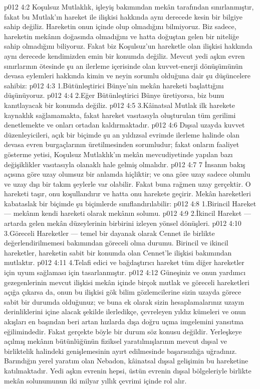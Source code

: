 \vs p012 4:2 Koşulsuz Mutlaklık, işleyiş bakımından mekân tarafından sınırlanmıştır, fakat bu Mutlak’ın hareket ile ilişkisi hakkında aynı derecede kesin bir bilgiye sahip değiliz. Hareketin onun içinde olup olmadığını bilmiyoruz. Biz sadece, hareketin mekânın doğasında olmadığını ve hatta  doğuştan gelen bir niteliğe sahip olmadığını biliyoruz. Fakat biz Koşulsuz’un hareketle olan ilişkisi hakkında aynı derecede kendimizden emin bir konumda değiliz. Mevcut yedi aşkın evren sınırlarının ötesinde şu an ilerleme içerisinde olan kuvvet\hyp{}enerji dönüşümünün devasa eylemleri hakkında kimin ve neyin sorumlu olduğuna dair şu düşüncelere sahibiz:
\vs p012 4:3 1.\bibnobreakspace Bütünleştirici Bünye’nin mekân  hareketi başlattığını düşünüyoruz.
\vs p012 4:4 2.\bibnobreakspace Eğer Bütünleştirici Bünye  üretiyorsa, biz bunu kanıtlayacak bir konumda değiliz.
\vs p012 4:5 3.\bibnobreakspace Kâinatsal Mutlak ilk harekete kaynaklık sağlamamakta, fakat hareket vasıtasıyla oluşturulan tüm gerilimi denetlemekte ve onları ortadan kaldırmaktadır.
\vs p012 4:6 Dışsal uzayda kuvvet düzenleyicileri, açık bir biçimde şu an yıldızsal evrimde ilerleme halinde olan devasa evren burgaçlarının üretilmesinden sorumludur; fakat onların faaliyet gösterme yetisi, Koşulsuz Mutlaklık’ın mekân mevcudiyetinde yapılan bazı değişiklikler vasıtasıyla olanaklı hale gelmiş olmalıdır.
\vs p012 4:7 7 İnsanın bakış açısına göre uzay olumsuz bir anlamda hiçliktir; ve ona göre uzay sadece olumlu ve uzay dışı bir takım şeylerle var olabilir. Fakat buna rağmen uzay gerçektir. O hareketi taşır, onu koşullandırır ve hatta onu harekete geçirir. Mekân hareketleri kabataslak bir biçimde şu biçimlerde sınıflandırılabilir:
\vs p012 4:8 1.\bibnobreakspace Birincil Hareket --- mekânın kendi hareketi olarak mekânın solumu.
\vs p012 4:9 2.\bibnobreakspace İkincil Hareket --- artarda gelen mekân düzeylerinin birbirini izleyen yönsel dönüşleri.
\vs p012 4:10 3.\bibnobreakspace Göreceli Hareketler --- temel bir dayanak olarak Cennet ile birlikte değerlendirilmemesi bakımından göreceli olma durumu. Birincil ve ikincil hareketler, hareketin sabit bir konumda olan Cennet’le ilişkisi bakımından mutlaktır.
\vs p012 4:11 4.\bibnobreakspace Telafi edici ve bağdaştırıcı hareket tüm diğer hareketler için uyum sağlaması için tasarlanmıştır.
\vs p012 4:12 Güneşiniz ve onun yardımcı gezegenlerinin mevcut ilişkisi mekân içinde birçok mutlak ve göreceli hareketleri açığa çıkarsa da, onun bu ilişkisi gök bilim gözlemcilerine sizin uzayda görece sabit bir durumda olduğunuz; ve buna ek olarak sizin hesaplamalarınız uzayın derinliklerini içine alacak şekilde ilerledikçe, çevreleyen yıldız kümeleri ve onun akışları en başından beri artan hızlarda dışa doğru uçma imgelemini yansıtma eğilimindedir. Fakat gerçekte böyle bir durum söz konusu değildir. Yerleşkeye açılmış mekânın bütünlüğünün fiziksel yaratılmışlarının mevcut dışsal ve birliktelik halindeki genişlemesinin ayırt edilmesinde başarısızlığa uğradınız. Barındığın yerel yaratım olan Nebadon, kâinatsal dışsal gelişimin bu hareketine katılmaktadır. Yedi aşkın evrenin hepsi, üstün evrenin dışsal bölgeleriyle birlikte mekân solunumunun iki milyar yıllık çevrimi içinde rol alır.
